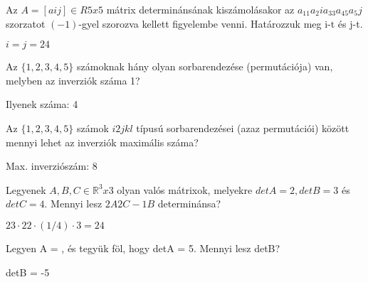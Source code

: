 \begin{frame}
  \begin{tcolorbox}[title={7/2. -R-}]
    Az $A = [aij] \in R5x5$ mátrix determinánsának kiszámolásakor az $a_11a_2ia_33a_45a_5j$ szorzatot $(-1)$-gyel szorozva kellett figyelembe venni. Határozzuk meg i-t és j-t.
  \tcblower

    \mmedskip 
    
    $i = j =
2 4$
  \end{tcolorbox}
\end{frame}


\begin{frame}
  \begin{tcolorbox}[title={7/3. -Q-}]
    Az $\{1,2,3,4,5\}$ számoknak hány olyan sorbarendezése (permutációja) van, melyben az inverziók száma 1?
  \tcblower

    \mmedskip 
    
     Ilyenek száma: 4
  \end{tcolorbox}
\end{frame}


\begin{frame}
  \begin{tcolorbox}[title={7/4. -Q-}]
    Az $\{1,2,3,4,5\}$ számok $i2jkl$ típusú sorbarendezései (azaz permutációi) között mennyi lehet az inverziók maximális száma?
  \tcblower

    \mmedskip 
    Max. inverziószám: 8
  \end{tcolorbox}
\end{frame}

\begin{frame}
  \begin{tcolorbox}[title={7/5. -N-}]
    Legyenek $A,B,C \in \mathbb{R}^3x3$ olyan valós mátrixok, melyekre $detA = 2, detB = 3$ és $detC = 4$. Mennyi lesz $2A2C-1B$ determinánsa?
  \tcblower

    \mmedskip 
    
     $23  \cdot 22  \cdot (1/4) \cdot 3 = 24$
  \end{tcolorbox}
\end{frame}

\begin{frame}
  \begin{tcolorbox}[title={7/6. -R-}]
    Legyen A =
, és
tegyük föl, hogy detA = 5. Mennyi lesz detB?

  \tcblower

    \mmedskip 
    
     detB = -5
  \end{tcolorbox}
\end{frame}


